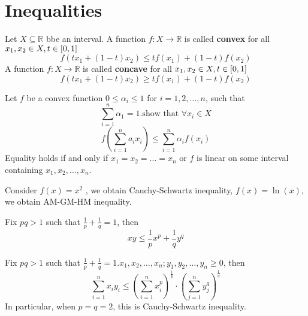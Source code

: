 \documentclass{book}
\numberwithin{equation}{section}
\begin{document}
\chapter{Inequalities}
\begin{definitionenv}
    Let $X\subseteq \mathbb{R}$ bbe an interval.
    \newline 
    A function $f:X\rightarrow \mathbb{R}$ is called \textbf{convex} for all $x_1, x_2\in X, t\in \interval{0}{1}$
    $$f(tx_1+(1-t)x_2)\le tf(x_1)+(1-t)f(x_2)$$
    \newline
    A function $f:X\rightarrow \mathbb{R}$ is called \textbf{concave} for all $x_1, x_2\in X, t\in \interval{0}{1}$
    $$f(tx_1+(1-t)x_2)\ge tf(x_1)+(1-t)f(x_2)$$
\end{definitionenv}
\begin{theoremenv}
    Let $f$ be a convex function $0\le \alpha_i\le 1$ for $i=1, 2, \dots , n$, such that 
    $$\sum_{i=1}^{n}\alpha_1=1.\text{show that } \forall x_i\in X$$
    $$f\left(\sum_{i=1}^{n}a_ix_i\right)\le \sum_{i=1}^{n}\alpha_if(x_i)$$
    Equality holds if and only if $x_1=x_2=\dots =x_n$ or $f$ is linear on some interval containing $x_1, x_2, \dots, x_n$.
\end{theoremenv}
\begin{remark}
    Consider $f(x)=x^2$ , we obtain Cauchy-Schwartz inequality, $f(x)=\ln (x)$,  we obtain AM-GM-HM inequality.
\end{remark}
\begin{theoremenv}
    \quad
    \newline
    Fix $pq>1$ such that $\frac{1}{p}+\frac{1}{q}=1$, then
    $$xy\le \frac{1}{p}x^p+\frac{1}{q}y^q$$
\end{theoremenv}
\begin{theoremenv}
    \quad
    \newline
    Fix $pq>1$ such that $\frac{1}{p}+\frac{1}{q}=1$.$x_1, x_2, \dots, x_n;y_1, y_2, \dots, y_n\ge 0$, then
    $$\sum_{i=1}^{n}x_iy_i\le \left(\sum_{i=1}^{n}x_i^p\right)^{\frac{1}{p}}\cdot\left(\sum_{j=1}^{n}y_j^q\right)^{\frac{1}{q}}$$
    In particular,  when $p=q=2$,  this is Cauchy-Schwartz inequality.
\end{theoremenv}
\end{document}
